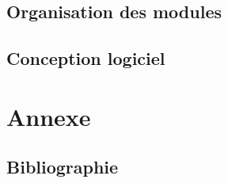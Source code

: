 \documentclass[a4paper,12pt]{article}
\begin{document}
    \subsection{Organisation des modules}

    \clearpage
    \subsection{Conception logiciel}
    
    \clearpage
    \section{Annexe}
    \label{sec:Annexe}
    \subsection{Bibliographie}

\end{document}
